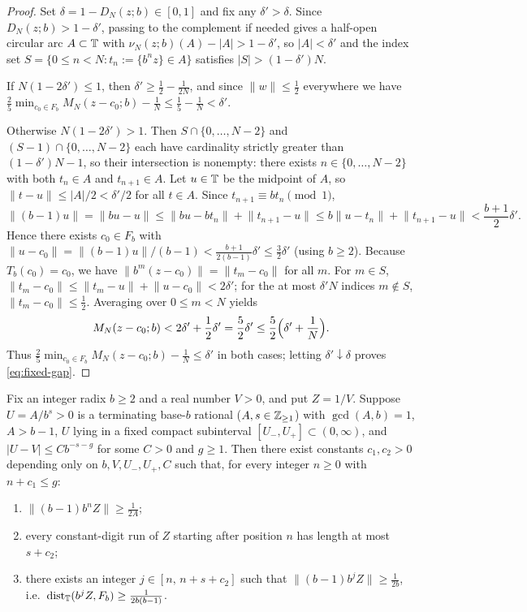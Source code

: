 \documentclass[11pt]{article}
\newcommand{\dist}[1]{\lVert #1\rVert}
\begin{document}
\begin{proof}
Set $\delta=1-D_N(z;b)\in[0,1]$ and fix any $\delta'>\delta$. Since $D_N(z;b)>1-\delta'$, passing to the complement if needed gives a half-open circular arc $A\subset\mathbb T$ with $\nu_N(z;b)(A)-|A|>1-\delta'$, so $|A|<\delta'$ and the index set $S=\{0\le n<N:t_n:=\{b^nz\}\in A\}$ satisfies $|S|>(1-\delta')N$.

If $N(1-2\delta')\le1$, then $\delta'\ge\frac12-\frac{1}{2N}$, and since $\dist{w}\le\frac12$ everywhere we have $\frac25\min_{c_0\in F_b}M_N(z-c_0;b)-\frac1N\le\frac15-\frac1N<\delta'$.

Otherwise $N(1-2\delta')>1$. Then $S\cap\{0,\dots,N-2\}$ and $(S-1)\cap\{0,\dots,N-2\}$ each have cardinality strictly greater than $(1-\delta')N-1$, so their intersection is nonempty: there exists $n\in\{0,\dots,N-2\}$ with both $t_n\in A$ and $t_{n+1}\in A$. Let $u\in\mathbb T$ be the midpoint of $A$, so $\dist{t-u}\le|A|/2<\delta'/2$ for all $t\in A$. Since $t_{n+1}\equiv bt_n\pmod1$,
\[
\dist{(b-1)u}=\dist{bu-u}\le\dist{bu-bt_n}+\dist{t_{n+1}-u}\le b\dist{u-t_n}+\dist{t_{n+1}-u}<\frac{b+1}{2}\delta'.
\]
Hence there exists $c_0\in F_b$ with $\dist{u-c_0}=\dist{(b-1)u}/(b-1)<\frac{b+1}{2(b-1)}\delta'\le\frac32\delta'$ (using $b\ge2$). Because $T_b(c_0)=c_0$, we have $\dist{b^m(z-c_0)}=\dist{t_m-c_0}$ for all $m$. For $m\in S$, $\dist{t_m-c_0}\le\dist{t_m-u}+\dist{u-c_0}<2\delta'$; for the at most $\delta'N$ indices $m\notin S$, $\dist{t_m-c_0}\le\frac12$. Averaging over $0\le m<N$ yields
\[
M_N(z-c_0;b)<2\delta'+\frac12\delta'=\frac52\delta'\le\frac52\Bigl(\delta'+\frac1N\Bigr).
\]
Thus $\frac25\min_{c_0\in F_b}M_N(z-c_0;b)-\frac1N\le\delta'$ in both cases; letting $\delta'\downarrow\delta$ proves \eqref{eq:fixed-gap}.
\end{proof}

\begin{lemma}\label{lem:recip-sep}
Fix an integer radix $b\ge2$ and a real number $V>0$, and put $Z=1/V$. Suppose $U=A/b^s>0$ is a terminating base-$b$ rational ($A,s\in\mathbb Z_{\ge1}$) with $\gcd(A,b)=1$, $A>b-1$, $U$ lying in a fixed compact subinterval $[U_-,U_+]\subset(0,\infty)$, and $|U-V|\le Cb^{-s-g}$ for some $C>0$ and $g\ge1$. Then there exist constants $c_1,c_2>0$ depending only on $b,V,U_-,U_+,C$ such that, for every integer $n\ge0$ with $n+c_1\le g$:
\begin{enumerate}[label=\textup{(\alph*)},nosep]
\item $\dist{(b-1)b^n Z}\ge\frac{1}{2A}$;
\item every constant-digit run of $Z$ starting after position $n$ has length at most $s+c_2$;
\item there exists an integer $j\in[n,\,n+s+c_2]$ such that $\dist{(b-1)b^j Z}\ge\frac{1}{2b}$, i.e.\ $\operatorname{dist}_{\mathbb T}(b^j Z,F_b)\ge\frac{1}{2b(b-1)}$.
\end{enumerate}
\end{lemma}
\end{document}
